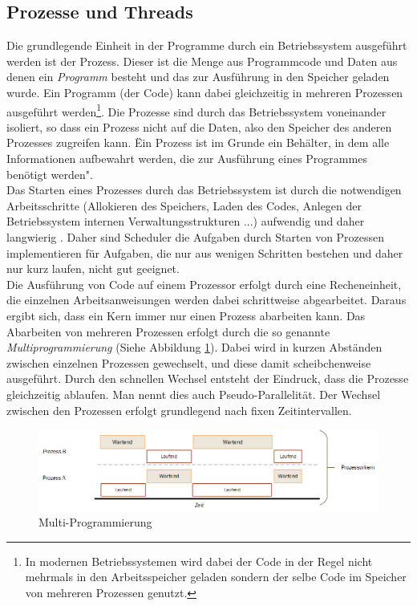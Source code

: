 \subsection{Prozesse und Threads}
Die grundlegende Einheit in der Programme durch ein Betriebssystem ausgeführt werden ist der Prozess. Dieser ist die Menge aus Programmcode und Daten aus denen ein \emph{Programm} besteht und das zur Ausführung in den Speicher geladen wurde. Ein Programm (der Code) kann dabei gleichzeitig in mehreren Prozessen ausgeführt werden\footnote{In modernen Betriebssystemen wird dabei der Code in der Regel nicht mehrmals in den Arbeitsspeicher geladen sondern der selbe Code im Speicher von mehreren Prozessen genutzt.}. Die Prozesse sind durch das Betriebssystem voneinander isoliert, so dass ein Prozess nicht auf die Daten, also den Speicher des anderen Prozesses zugreifen kann.\parencite[S. 71ff]{tanenbaum2016} \"Ein Prozess ist im Grunde ein Behälter, in dem alle Informationen aufbewahrt werden, die zur Ausführung eines Programmes benötigt werden"\parencite[S. 71]{tanenbaum2016}.
\\Das Starten eines Prozesses durch das Betriebssystem ist durch die notwendigen Arbeitsschritte (Allokieren des Speichers, Laden des Codes, Anlegen der Betriebssystem internen Verwaltungsstrukturen ...) aufwendig und daher langwierig \parencite[S.1091ff]{tanenbaum2016}. Daher sind Scheduler die Aufgaben durch Starten von Prozessen implementieren für Aufgaben, die nur aus wenigen Schritten bestehen und daher nur kurz laufen, nicht gut geeignet.
\\Die Ausführung von Code auf einem Prozessor erfolgt durch eine Recheneinheit, die einzelnen Arbeitsanweisungen werden dabei schrittweise abgearbeitet. Daraus ergibt sich, dass ein Kern immer nur einen Prozess abarbeiten kann. Das Abarbeiten von mehreren Prozessen erfolgt durch die so genannte \emph{Multiprogrammierung} (Siehe Abbildung \ref{fig:time_slice}). Dabei wird in kurzen Abständen zwischen einzelnen Prozessen gewechselt, und diese damit scheibchenweise ausgeführt. Durch den schnellen Wechsel entsteht der Eindruck, dass die Prozesse gleichzeitig ablaufen. Man nennt dies auch Pseudo-Parallelität.\parencite[S. 127ff]{tanenbaum2016} Der Wechsel zwischen den Prozessen erfolgt grundlegend nach fixen Zeitintervallen.

\begin{figure}
	\centering
	\includegraphics[width=0.7\linewidth]{images/time_slice}
	\caption{Multi-Programmierung\parencite[S. 128]{tanenbaum2016}}
	\label{fig:time_slice}
\end{figure}

